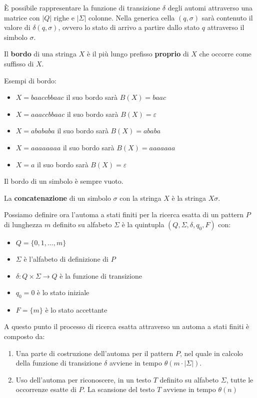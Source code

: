 È possibile rappresentare la funzione di transizione $\delta$ degli automi attraverso una matrice con $|Q|$ righe e $|\Sigma|$ colonne. Nella generica cella $(q, \sigma)$ sarà contenuto il valore di $\delta(q, \sigma)$, ovvero lo stato di arrivo a partire dallo stato $q$ attraverso il simbolo $\sigma$.
\begin{definizione}
    Il \textbf{bordo} di una stringa $X$ è il più lungo prefisso \textbf{proprio} di $X$ che occorre come suffisso di $X$. 
\end{definizione}
\begin{esempio}
    Esempi di bordo:
    \begin{itemize}
        \item $X = baaccbbaac$ il suo bordo sarà $B(X) = baac$
        \item $X = aaaccbbaac$ il suo bordo sarà $B(X) = \varepsilon$
        \item $X = abababa$ il suo bordo sarà $B(X) = ababa$
        \item $X = aaaaaaaa$ il suo bordo sarà $B(X) = aaaaaaa$
        \item $X = a$ il suo bordo sarà $B(X) = \varepsilon$
    \end{itemize}
\end{esempio}
\begin{nota}
    Il bordo di un simbolo è sempre vuoto.
\end{nota}
\begin{definizione}
    La \textbf{concatenazione} di un simbolo $\sigma$ con la stringa $X$ è la stringa $X\sigma$.
\end{definizione}
Possiamo definire ora l'automa a stati finiti per la ricerca esatta di un pattern $P$ di lunghezza $m$ definito su alfabeto $\Sigma$ è la quintupla $(Q, \Sigma, \delta, q_0, F)$ con:
\begin{itemize}
    \item $Q = \{0, 1, \dots, m\}$
    \item $\Sigma$ è l'alfabeto di definizione di $P$
    \item $\delta: Q \times \Sigma \to Q$ è la funzione di transizione
    \item $q_0 = 0$ è lo stato iniziale
    \item $F = \{m\}$ è lo stato accettante
\end{itemize}
A questo punto il processo di ricerca esatta attraverso un automa a stati finiti è composto da:
\begin{enumerate}
    \item Una parte di costruzione dell'automa per il pattern $P$, nel quale in calcolo della funzione di transizione $\delta$ avviene in tempo $\theta(m \cdot |\Sigma|)$.
    \item Uso dell'automa per riconoscere, in un testo $T$ definito su alfabeto $\Sigma$, tutte le occorrenze esatte di $P$. La scansione del testo $T$ avviene in tempo $\theta(n)$
\end{enumerate}
